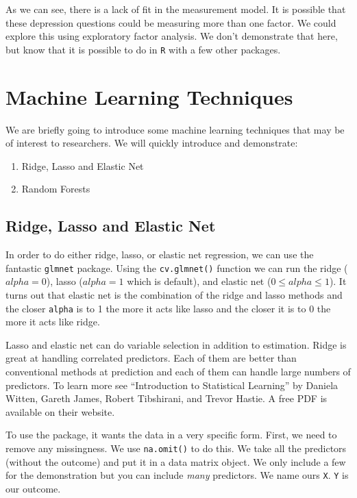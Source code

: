 \documentclass[]{tufte-book}
\providecommand{\tightlist}{%
  \setlength{\itemsep}{0pt}\setlength{\parskip}{0pt}}
\theoremstyle{definition}
\theoremstyle{definition}
\theoremstyle{remark}
\begin{document}
As we can see, there is a lack of fit in the measurement model. It is
possible that these depression questions could be measuring more than
one factor. We could explore this using exploratory factor analysis. We
don't demonstrate that here, but know that it is possible to do in
\texttt{R} with a few other packages.

\section*{Machine Learning
Techniques}\label{machine-learning-techniques}

We are briefly going to introduce some machine learning techniques that
may be of interest to researchers. We will quickly introduce and
demonstrate:

\begin{enumerate}
\def\labelenumi{\arabic{enumi}.}
\tightlist
\item
  Ridge, Lasso and Elastic Net
\item
  Random Forests
\end{enumerate}

\subsection*{Ridge, Lasso and Elastic
Net}\label{ridge-lasso-and-elastic-net}

In order to do either ridge, lasso, or elastic net regression, we can
use the fantastic \texttt{glmnet} package. Using the
\texttt{cv.glmnet()} function we can run the ridge (\(alpha = 0\)),
lasso (\(alpha = 1\) which is default), and elastic net
(\(0 \leq alpha \leq 1\)). It turns out that elastic net is the
combination of the ridge and lasso methods and the closer \texttt{alpha}
is to 1 the more it acts like lasso and the closer it is to 0 the more
it acts like ridge.

Lasso and elastic net can do variable selection in addition to
estimation. Ridge is great at handling correlated predictors. Each of
them are better than conventional methods at prediction and each of them
can handle large numbers of predictors. To learn more see ``Introduction
to Statistical Learning'' by Daniela Witten, Gareth James, Robert
Tibshirani, and Trevor Hastie. A free PDF is available on their website.

To use the package, it wants the data in a very specific form. First, we
need to remove any missingness. We use \texttt{na.omit()} to do this. We
take all the predictors (without the outcome) and put it in a data
matrix object. We only include a few for the demonstration but you can
include \emph{many} predictors. We name ours \texttt{X}. \texttt{Y} is
our outcome.
\end{document}
